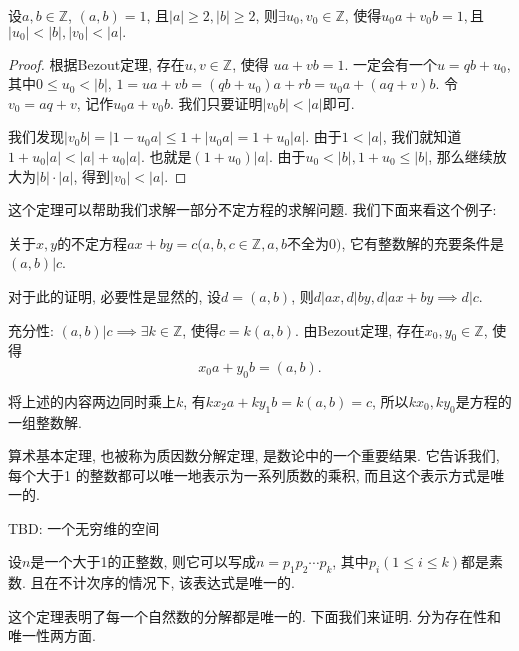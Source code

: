 \begin{theorem}
    设$a,b\in \mathbb Z$, $(a, b)=1$, 且$|a|\geq 2, |b|\geq 2$, 则$\exists u_0,v_0\in \mathbb Z$,
    使得$u_0a+v_0b=1,$且$|u_0|<|b|, |v_0|<|a|.$ 
\end{theorem}

\begin{proof}
    根据Bezout定理, 存在$u,v\in \mathbb Z$, 使得 $ua+vb=1$. 一定会有一个$u=qb+u_0$, 其中$0\leq u_0<|b|$,
    $1=ua+vb=(qb+u_0)a+rb=u_0a+(aq+v)b$. 令$v_0=aq+v$, 记作$u_0a+v_0b$. 我们只要证明$|v_0b|<|a|$即可. 

    我们发现$|v_0b|=|1-u_0a|\leq 1+|u_0a|=1+u_0|a|$. 由于$1<|a|$, 我们就知道$1+u_0|a|<|a|+u_0|a|$. 
    也就是$(1+u_0)|a|$. 由于$u_0<|b|, 1+u_0\leq |b|$, 那么继续放大为$|b|\cdot|a|$, 得到$|v_0|<|a|.$
\end{proof}

这个定理可以帮助我们求解一部分不定方程的求解问题. 我们下面来看这个例子: 

\begin{example}
    关于$x,y$的不定方程$ax+by=c(a,b,c\in \mathbb Z, a,b$不全为$0)$, 它有整数解的充要条件是
    $(a,b)|c$. 
    
    对于此的证明, 必要性是显然的, 设$d=(a,b)$, 则$d|ax, d|by, d|ax+by \implies d|c$.

    充分性: $(a,b)|c\implies \exists k\in \mathbb Z$, 使得$c=k(a,b)$. 由Bezout定理, 
    存在$x_0, y_0\in \mathbb Z$, 使得$$x_0a+y_0b=(a,b). $$
    
    将上述的内容两边同时乘上$k$, 有$kx_2a+ky_1b=k(a,b)=c$, 所以$kx_0, ky_0$是方程的一组整数解. 
\end{example}

 算术基本定理, 也被称为质因数分解定理, 是数论中的一个重要结果. 它告诉我们, 每个大于1
的整数都可以唯一地表示为一系列质数的乘积, 而且这个表示方式是唯一的. 

TBD: 一个无穷维的空间

\begin{theorem}[算术基本定理]
    设$n$是一个大于1的正整数, 则它可以写成$n=p_1p_2\cdots p_k$, 其中$p_i
    (1\leq i\leq k)$都是素数. 且在不计次序的情况下, 该表达式是唯一的. 
\end{theorem}

这个定理表明了每一个自然数的分解都是唯一的. 下面我们来证明. 分为存在性和唯一性两方面.

